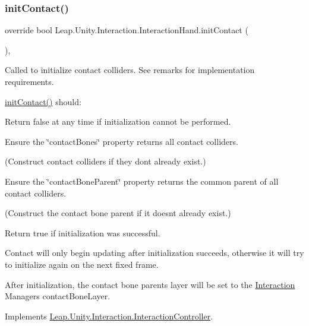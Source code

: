 \subsubsection{\texorpdfstring{initContact()}{initContact()}}
{\footnotesize\ttfamily override bool Leap.\+Unity.\+Interaction.\+Interaction\+Hand.\+init\+Contact (\begin{DoxyParamCaption}{ }\end{DoxyParamCaption})\hspace{0.3cm}{\ttfamily [protected]}, {\ttfamily [virtual]}}



Called to initialize contact colliders. See remarks for implementation requirements. 

\mbox{\hyperlink{class_leap_1_1_unity_1_1_interaction_1_1_interaction_hand_a01581c96fd67f53a9b8a6ddc36e0709c}{init\+Contact()}} should\+:
\begin{DoxyItemize}
\item Return false at any time if initialization cannot be performed.
\item Ensure the \char`\"{}contact\+Bones\char`\"{} property returns all contact colliders.
\begin{DoxyItemize}
\item (Construct contact colliders if they don\textquotesingle{}t already exist.)
\end{DoxyItemize}
\item Ensure the \char`\"{}contact\+Bone\+Parent\char`\"{} property returns the common parent of all contact colliders.
\begin{DoxyItemize}
\item (Construct the contact bone parent if it doesn\textquotesingle{}t already exist.)
\end{DoxyItemize}
\item Return true if initialization was successful.
\end{DoxyItemize}

Contact will only begin updating after initialization succeeds, otherwise it will try to initialize again on the next fixed frame.

After initialization, the contact bone parent\textquotesingle{}s layer will be set to the \mbox{\hyperlink{namespace_leap_1_1_unity_1_1_interaction}{Interaction}} Manager\textquotesingle{}s contact\+Bone\+Layer. 

Implements \mbox{\hyperlink{class_leap_1_1_unity_1_1_interaction_1_1_interaction_controller_a5d9713dd48f3093aefbd8ebbba3b0251}{Leap.\+Unity.\+Interaction.\+Interaction\+Controller}}.



